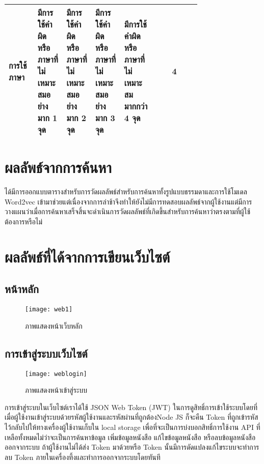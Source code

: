 \begin{table}[H]
\begin{tabular}{|p{0.15\linewidth}|p{0.15\linewidth}|p{0.15\linewidth}|p{0.15\linewidth}|p{0.15\linewidth}|c|}
การใช้ภาษา           & มีการใช้คำผิดหรือภาษาที่ไม่เหมาะสมอย่างมาก   1 จุด                                                               &  มีการใช้คำผิดหรือภาษาที่ไม่เหมาะสมอย่างมาก   2 จุด                                                &มีการใช้คำผิดหรือภาษาที่ไม่เหมาะสมอย่างมาก 3 จุด                                                                 & มีการใช้คำผิดหรือภาษาที่ไม่เหมาะสมมากกว่า 4 จุด                                               & 4           \\ \hline
\end{tabular}
\end{table}

\section{ผลลัพธ์จากการค้นหา}

ได้มีการออกแบบตารางสำหรับการวัดผลลัพธ์สำหรับการค้นหาทั้งรูปแบบธรรมดาและการใช้โมเดล Word2vec เข้ามาช่วยแต่เนื่องจากการล่าช้าจึงทำให้ยังไม่มีการทดสอบผลลัพธ์จากผู้ใช้งานแต่มีการวางแผนว่าเมื่อการค้นหาเสร็จสิ้นจะดำเนินการวัดผลลัพธ์ที่เกิดขึ้นสำหรับการค้นหาว่าตรงตามที่ผู้ใช้ต้องการหรือไม่

\section{ผลลัพธ์ที่ได้จากการเขียนเว็บไซต์}
\subsection{หน้าหลัก}
\begin{figure}[H]
    \centering
    \texttt{[image: web1]}
    \caption{ภาพแสดงหน้าเว็บหลัก}\label{fig:web1}
\end{figure}

\subsection{การเข้าสู่ระบบเว็บไซต์}
\begin{figure}[H]
    \centering
    \texttt{[image: weblogin]}
    \caption{ภาพแสดงหน้าเข้าสู่ระบบ}\label{fig:weblogin}
\end{figure}
การเข้าสู่ระบบในเว็บไซต์เราได้ใช้ JSON Web Token (JWT) ในการดูสิทธิ์การเข้าใช้ระบบโดยที่เมื่อผู้ใช้งานเข้าสู่ระบบด้วยรหัสผู้ใช้งานและรหัสผ่านที่ถูกต้องNode JS ก็จะคืน Token ที่ถูกเข้ารหัสไว้กลับไปให้ทางเครื่องผู้ใช้งานเก็บใน local storage เพื่อที่จะเป็นการบ่งบอกสิทธิ์การใช้งาน API ที่เหลือทั้งหมดไม่ว่าจะเป็นการค้นหาข้อมูล เพิ่มข้อมูลหนังสือ แก้ไขข้อมูลหนังสือ หรือลบข้อมูลหนังสือออกจากระบบ ถ้าผู้ใช้งานไม่ได้ส่ง Token มาด้วยหรือ Token นั้นมีการดัดแปลงแก้ไขระบบจะทำการลบ Token ภายในเครื่องทึ้งและทำการออกจากระบบโดยทันที

